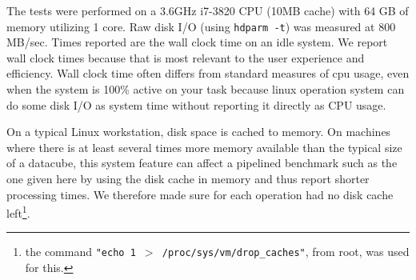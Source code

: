 \documentclass{article}
\begin{document}
The tests were performed on a 3.6GHz i7-3820 CPU (10MB cache) with 64
GB of memory utilizing 1 core.  Raw disk I/O (using {\tt hdparm -t})
was measured at 800 MB/sec. Times reported are the wall clock time on
an idle system. 
We report wall clock times because that is most relevant to the
user experience and efficiency. Wall clock time often differs from
standard measures of cpu usage, even when the system is 100\% active
on your task because linux operation system can do some disk I/O
as system time without reporting it directly as CPU usage.

On a typical Linux workstation, disk space is cached to memory. On
machines where there is at least several times more memory available
than the typical size of a datacube, this system feature can affect
a pipelined benchmark such as the one given here by using the
disk cache in memory and thus report shorter processing times.
We therefore made sure
for each operation had no disk cache left\footnote{the command
{\tt "echo 1 $>$ /proc/sys/vm/drop\_caches"}, from root, was used for this.}.
\end{document}
